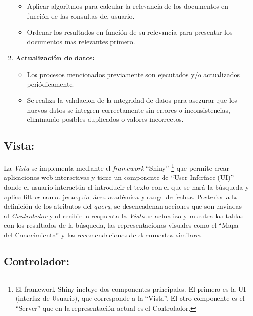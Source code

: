 \documentclass[
  12pt,
  openany]{book}
\begin{document}
\begin{enumerate}
  \begin{itemize}
  \item
    Aplicar algoritmos para calcular la relevancia de los documentos en función de las consultas del usuario.
  \item
    Ordenar los resultados en función de su relevancia para presentar los documentos más relevantes primero.
  \end{itemize}
\item
  \textbf{Actualización de datos:}

  \begin{itemize}
  \item
    Los procesos mencionados previamente son ejecutados y/o actualizados periódicamente.
  \item
    Se realiza la validación de la integridad de datos para asegurar que los nuevos datos se integren correctamente sin errores o inconsistencias, eliminando posibles duplicados o valores incorrectos.
  \end{itemize}
\end{enumerate}

\hypertarget{vista}{%
\subsection{\texorpdfstring{\textbf{Vista:}}{Vista:}}\label{vista}}

La \emph{Vista} se implementa mediante el \emph{framework} ``Shiny'' \citep{shiny} \footnote{El framework Shiny incluye dos componentes principales. El primero es la UI (interfaz de Usuario), que corresponde a la ``Vista''. El otro componente es el ``Server'' que en la representación actual es el Controlador.} que permite crear aplicaciones web interactivas y tiene un componente de ``User Inferface (UI)'' donde el usuario interactúa al introducir el texto con el que se hará la búsqueda y aplica filtros como: jerarquía, área académica y rango de fechas. Posterior a la definición de los atributos del \emph{query}, se desencadenan acciones que son enviadas al \emph{Controlador} y al recibir la respuesta la \emph{Vista} se actualiza y muestra las tablas con los resultados de la búsqueda, las representaciones visuales como el ``Mapa del Conocimiento'' y las recomendaciones de documentos similares.

\hypertarget{controlador}{%
\subsection{\texorpdfstring{\textbf{Controlador:}}{Controlador:}}\label{controlador}}
\end{document}
